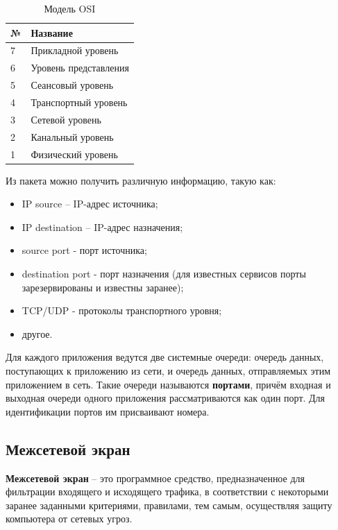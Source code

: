 \begin{table}[h]
	\begin{center}
		\caption{Модель OSI}
		\label{osi_table}
		\begin{tabular}{| p{1cm} | p{7cm} |}
			\hline
			\textbf{№} 	& \textbf{Название} \\
			\hline
			7 				& Прикладной уровень\\ 
			\hline
			6 				& Уровень представления  \\ 
			\hline
			5 		& Сеансовый уровень \\ 
			\hline
			4 		& Транспортный уровень \\ 
			\hline
			3 		& Сетевой уровень \\ 
			\hline
			2 		& Канальный уровень \\ 
			\hline
			1 		& Физический уровень \\ 
			\hline
		\end{tabular}
	\end{center}
\end{table} 

\newpage

Из пакета можно получить различную информацию, такую как:
\begin{itemize}
	\item IP source – IP-адрес источника;
	
	\item IP destination – IP-адрес назначения;
	
	\item source port - порт источника;
	
	\item destination port - порт назначения (для известных сервисов порты зарезервированы и известны заранее);
	
	\item TCP/UDP - протоколы транспортного уровня;
	
	\item другое. \\
\end{itemize}

Для каждого приложения ведутся две системные очереди: очередь данных, поступающих к приложению из сети, и очередь данных, отправляемых этим приложением в сеть. Такие очереди называются \textbf{портами}, причём входная и выходная очереди одного приложения рассматриваются как один порт. Для идентификации портов им присваивают номера. \newline

\subsection{Межсетевой экран}
\textbf{Межсетевой экран} -- это программное средство, предназначенное для фильтрации входящего и исходящего трафика, в соответствии с некоторыми заранее заданными критериями, правилами, тем самым, осуществляя защиту компьютера от сетевых угроз. 


